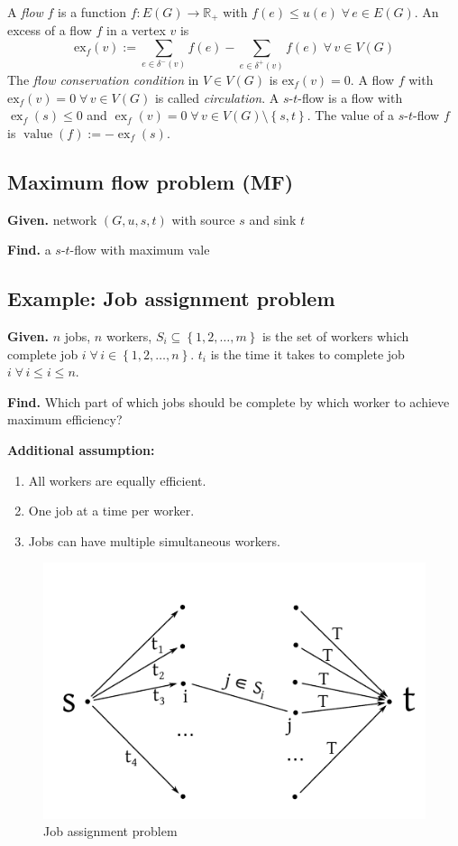 \documentclass[a4paper]{article}
\theoremstyle{definition}
\newcommand{\set}[1]{\left\{#1\right\}}
\newcommand{\given}[1]{\textbf{Given.} #1\par}
\newcommand{\find}[1]{\textbf{Find.} #1\par}
\newcommand{\flow}[2]{$#1$-$#2$-flow}
\newcommand{\fall}{\;\forall\,}
\DeclareMathOperator{\ex}{ex}
\begin{document}
A \emph{flow} $f$ is a function $f: E(G) \rightarrow \mathbb{R}_+$ with $f(e) \leq u(e) \fall e \in E(G)$. An excess of a flow $f$ in a vertex $v$ is
\[
  \text{ex}_f(v) :=
    \sum_{e \in \delta^-(v)} f(e) -
    \sum_{e \in \delta^+(v)} f(e)
    \fall v \in V(G)
\]
The \emph{flow conservation condition} in $V \in V(G)$ is $\text{ex}_f(v) = 0$. A flow $f$ with $\text{ex}_f(v) = 0 \fall v \in V(G)$ is called \emph{circulation}. A \flow st is a flow with $\ex_f(s) \leq 0$ and $\ex_f(v) = 0 \fall v \in V(G) \setminus \set{s, t}$. The value of a \flow st $f$ is $\operatorname{value}(f) := -\ex_f(s)$.

\subsection{Maximum flow problem (MF)}
%
\given{network $(G, u, s, t)$ with source $s$ and sink $t$}
\find{a \flow st with maximum vale}

\subsection{Example: Job assignment problem}
%
\given{$n$ jobs, $n$ workers, $S_i \subseteq \set{1, 2, \ldots, m}$ is the set of workers which complete job $i \fall i \in \set{1, 2, \ldots, n}$. $t_i$ is the time it takes to complete job $i \fall i \leq i \leq n$. }
\find{Which part of which jobs should be complete by which worker to achieve maximum efficiency?}

\textbf{Additional assumption:}
\begin{enumerate}
  \item All workers are equally efficient.
  \item One job at a time per worker.
  \item Jobs can have multiple simultaneous workers.
\end{enumerate}

 \begin{figure}[ht]
  \begin{center}
   \includegraphics{img/max_flow_jobs.pdf}
   \caption{Job assignment problem}
  \end{center}
 \end{figure}
\end{document}
